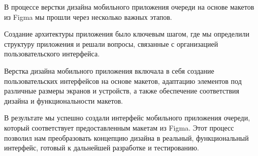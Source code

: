 В процессе верстки дизайна мобильного приложения очереди
на основе макетов из Figma мы прошли через несколько важных этапов.\par
Создание архитектуры приложения было ключевым шагом,
где мы определили структуру приложения и решали вопросы,
связанные с организацией пользовательского интерфейса.\par
Верстка дизайна мобильного приложения включала в себя создание
пользовательских интерфейсов на основе макетов,
адаптацию элементов под различные размеры экранов и устройств,
а также обеспечение соответствия дизайна и функциональности макетов.\par
В результате мы успешно создали интерфейс мобильного приложения очереди,
который соответствует предоставленным макетам из Figma.
Этот процесс позволил нам преобразовать концепцию дизайна в реальный,
функциональный интерфейс, готовый к дальнейшей разработке и тестированию.

